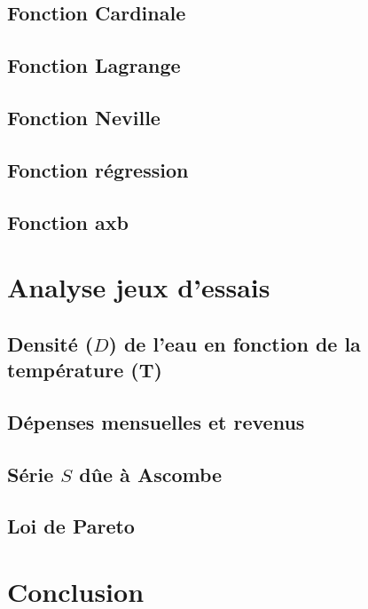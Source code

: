 \documentclass[12pt,french,titlepage]{article}
\begin{document}
	\subsection{Fonction Cardinale}
	
	\subsection{Fonction Lagrange}
	
	\subsection{Fonction Neville}
	
	\subsection{Fonction régression}
	
	\subsection{Fonction axb}
	
	\section{Analyse jeux d'essais}
	
	\subsection{Densité ($D$) de l'eau en fonction de la température (T)}
	
	\subsection{Dépenses mensuelles et revenus}
	
	\subsection{Série $S$ dûe à Ascombe}
	
	\subsection{Loi de Pareto}
	
	\section{Conclusion}
	
	
	
\end{document}
